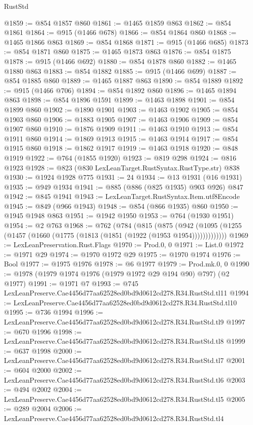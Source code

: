 \begin{lexlean}{RustStd}
\begin{coremodule}
@1859 := @854 @1857 @860
@1861 := @1465 @1859 @863
@1862 := @854 @1861
@1864 := @915 (@1466 @678)
@1866 := @854 @1864 @860
@1868 := @1465 @1866 @863
@1869 := @854 @1868
@1871 := @915 (@1466 @685)
@1873 := @854 @1871 @860
@1875 := @1465 @1873 @863
@1876 := @854 @1875
@1878 := @915 (@1466 @692)
@1880 := @854 @1878 @860
@1882 := @1465 @1880 @863
@1883 := @854 @1882
@1885 := @915 (@1466 @699)
@1887 := @854 @1885 @860
@1889 := @1465 @1887 @863
@1890 := @854 @1889
@1892 := @915 (@1466 @706)
@1894 := @854 @1892 @860
@1896 := @1465 @1894 @863
@1898 := @854 @1896 @1591
@1899 := @1463 @1898
@1901 := @854 @1899 @860
@1902 := @1890 @1901
@1903 := @1463 @1902
@1905 := @854 @1903 @860
@1906 := @1883 @1905
@1907 := @1463 @1906
@1909 := @854 @1907 @860
@1910 := @1876 @1909
@1911 := @1463 @1910
@1913 := @854 @1911 @860
@1914 := @1869 @1913
@1915 := @1463 @1914
@1917 := @854 @1915 @860
@1918 := @1862 @1917
@1919 := @1463 @1918
@1920 := @848 @1919
@1922 := @764 (@1855 @1920)
@1923 := @819 @298
@1924 := @816 @1923
@1928 := @823 (@830 LexLeanTarget.RustSyntax.RustType.str) @838
@1930 := @1924 @1928 @775
@1931 := 24
@1934 := @13 @1931 (@16 @1931)
@1935 := @949 @1934
@1941 := @885 (@886 (@825 @1935) @903 @926) @847
@1942 := @845 @1941
@1943 := LexLeanTarget.RustSyntax.Item.utf8Encode
@1945 := @849 (@966 @1943)
@1948 := @854 (@866 @1935) @860
@1950 := @1945 @1948 @863
@1951 := @1942 @1950
@1953 := @764 (@1930 @1951)
@1954 := @2 @763
@1968 := @762
    (@784
      (@815
        (@875
          (@942 (@1095 (@1255 (@1457 (@1660 (@1775 (@1813 (@1851 (@1922 (@1953 @1954)))))))))))))
@1969 := LexLeanPreservation.Rust.Flags
@1970 := Prod.{0, 0}
@1971 := List.{0}
@1972 := @1971 @29
@1974 := @1970 @1972 @29
@1975 := @1970 @1974
@1976 := Bool
@1977 := @1975 @1976
@1978 := @6 @1977
@1979 := Prod.mk.{0, 0}
@1990 := @1978 (@1979 @1974 @1976 (@1979 @1972 @29 @194 @90) @797) (@2 @1977)
@1991 := @1971 @7
@1993 := @745 LexLeanPreserve.Cae4456d77aa62528ed0bd9d0612cd278.R34.RustStd.tl11
@1994 := LexLeanPreserve.Cae4456d77aa62528ed0bd9d0612cd278.R34.RustStd.tl10
@1995 := @736 @1994
@1996 := LexLeanPreserve.Cae4456d77aa62528ed0bd9d0612cd278.R34.RustStd.tl9
@1997 := @670 @1996
@1998 := LexLeanPreserve.Cae4456d77aa62528ed0bd9d0612cd278.R34.RustStd.tl8
@1999 := @637 @1998
@2000 := LexLeanPreserve.Cae4456d77aa62528ed0bd9d0612cd278.R34.RustStd.tl7
@2001 := @604 @2000
@2002 := LexLeanPreserve.Cae4456d77aa62528ed0bd9d0612cd278.R34.RustStd.tl6
@2003 := @494 @2002
@2004 := LexLeanPreserve.Cae4456d77aa62528ed0bd9d0612cd278.R34.RustStd.tl5
@2005 := @289 @2004
@2006 := LexLeanPreserve.Cae4456d77aa62528ed0bd9d0612cd278.R34.RustStd.tl4

\end{coremodule}
\end{lexlean}
